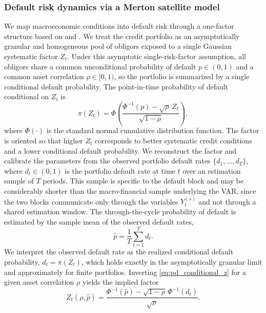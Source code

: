 \subsubsection{Default risk dynamics via a Merton satellite model}
We map macroeconomic conditions into default risk through a one-factor structure
based on \citet{merton1974pricing} and \citet{vasicek2002distribution}. We treat
the credit portfolio as an asymptotically granular and homogeneous pool of
obligors exposed to a single Gaussian systematic factor $Z_t$. Under this
asymptotic single-risk-factor assumption, all obligors share a common
unconditional probability of default $p \in (0,1)$ and a common asset
correlation $\rho \in [0,1)$, so the portfolio is summarized by a single
conditional default probability. The point-in-time probability of default
conditional on $Z_t$ is
\begin{equation}
    \pi(Z_t) = \Phi\!\left(
        \frac{\Phi^{-1}(p) - \sqrt{\rho}\, Z_t}{\sqrt{1-\rho}} \right),
    \label{eq:pd_conditional_z}
\end{equation}
where $\Phi(\cdot)$ is the standard normal cumulative distribution function. The
factor is oriented so that higher $Z_t$ corresponds to better systematic credit
conditions and a lower conditional default probability.
We reconstruct the factor and calibrate the parameters from the observed
portfolio default rates $\{d_1,\dots,d_T\}$, where $d_t \in (0,1)$ is the
portfolio default rate at time $t$ over an estimation sample of $T$ periods. This
sample is specific to the default block and may be considerably shorter than the
macro-financial sample underlying the VAR, since the two blocks communicate only
through the variables $Y^{(s)}_t$ and not through a shared estimation window. The
through-the-cycle probability of default is estimated by the sample mean of the
observed default rates,
\begin{equation}
    \widehat{p} = \frac{1}{T}\sum_{t=1}^T d_t.
    \label{eq:longrun_pd}
\end{equation}
We interpret the observed default rate as the realized conditional default
probability, $d_t = \pi(Z_t)$, which holds exactly in the asymptotically
granular limit and approximately for finite portfolios. Inverting
\eqref{eq:pd_conditional_z} for a given asset correlation $\rho$ yields the
implied factor
\begin{equation}
    Z_t(\rho,\widehat p)
    = \frac{\Phi^{-1}(\widehat p) - \sqrt{1-\rho}\,\Phi^{-1}(d_t)}{\sqrt{\rho}}.
    \label{eq:determines_z_hist}
\end{equation}
